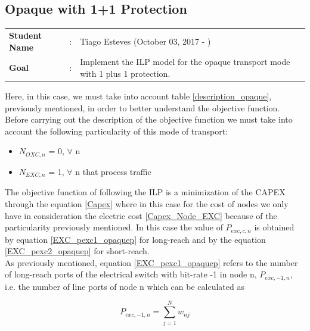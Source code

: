 \clearpage

\subsection{Opaque with 1+1 Protection}\label{ILP_Opaque_Protection}
\begin{tcolorbox}	
\begin{tabular}{p{2.75cm} p{0.2cm} p{10.5cm}} 	
\textbf{Student Name}  &:& Tiago Esteves    (October 03, 2017 - )\\
\textbf{Goal}          &:& Implement the ILP model for the opaque transport mode with 1 plus 1 protection.
\end{tabular}
\end{tcolorbox}
\vspace{11pt}

Here, in this case, we must take into account table \ref{description_opaque}, previously mentioned, in order to better understand the objective function.\\

Before carrying out the description of the objective function we must take into account the following particularity of this mode of transport:
\begin{itemize}
  \item $N_{OXC,n}$ = 0, \quad $\forall$ n
  \item $N_{EXC,n}$ = 1, \quad $\forall$ n that process traffic
\end{itemize}


\vspace{11pt}
The objective function of following the ILP is a minimization of the CAPEX through the equation \ref{Capex} where in this case for the cost of nodes we only have in consideration the electric cost \ref{Capex_Node_EXC} because of the particularity previously mentioned.
In this case the value of $P_{exc,c,n}$ is obtained by equation \ref{EXC_pexc1_opaquep} for long-reach and by the equation \ref{EXC_pexc2_opaquep} for short-reach.\\

As previously mentioned, equation \ref{EXC_pexc1_opaquep} refers to the number of long-reach ports of the electrical switch with bit-rate -1 in node n, $P_{exc,-1,n}$, i.e. the number of line ports of node n which can be calculated as

\begin{equation}
P_{exc,-1,n} = \sum_{j=1}^{N} w_{nj}
\label{EXC_pexc1_opaquep}
\end{equation}

